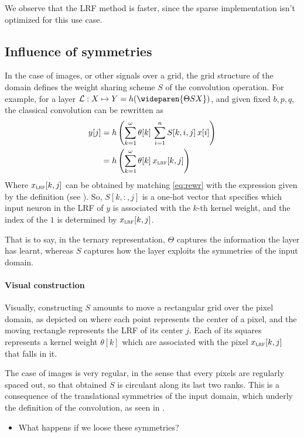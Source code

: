 We observe that the LRF method is faster, since the sparse implementation isn't optimized for this use case.

\subsection{Influence of symmetries}
\label{sec:sym}

In the case of images, or other signals over a grid, the grid structure of the domain defines the weight sharing scheme $S$ of the convolution operation. For example, for a layer $\cl : X  \mapsto Y = h(\wideparen{\Theta S X})$, and given fixed $b,p,q$, the classical convolution can be rewritten as
\begin{align}
y[j] &= h\left(\displaystyle \sum_{k=1}^{\omega} \theta[k] \h{2} \sum_{i=1}^n S[k,i,j] \h{2} x[i] \right)\\
&= h\left(\displaystyle \sum_{k=1}^{\omega} \theta[k] \h{2} x_{\LRF}[k,j] \right) \label{eq:rewr}
\end{align}
Where $x_{\LRF}[k,j]$ can be obtained by matching \eqref{eq:rewr} with the expression given by the definition (see ). So, $S[k,:,j]$ is a one-hot vector that specifies which input neuron in the LRF of $y$ is associated with the $k$-th kernel weight, and the index of the $1$ is determined by $x_{\LRF}[k,j]$.

That is to say, in the ternary representation, $\Theta$ captures the information the layer has learnt, whereas $S$ captures how the layer exploits the symmetries of the input domain.

\paragraph{Visual construction}
Visually, constructing $S$ amounts to move a rectangular grid over the pixel domain, as depicted on  where each point represents the center of a pixel, and the moving rectangle represents the LRF of its center $j$. Each of its squares represents a kernel weight $\theta[k]$ which are associated with the pixel $x_{\LRF}[k,j]$ that falls in it.



The case of images is very regular, in the sense that every pixels are regularly spaced out, so that obtained $S$ is circulant along its last two ranks. This is a consequence of the translational symmetries of the input domain, which underly the definition of the convolution, as seen in .
\begin{itemize}
\item What happens if we loose these symmetries?
\end{itemize}

